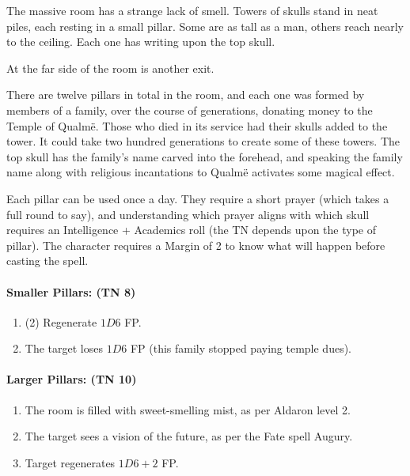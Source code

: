 \begin{multicols}{2}
\begin{boxtext}
	The massive room has a strange lack of smell.  Towers of skulls stand in neat piles, each resting in a small pillar.  Some are as tall as a man, others reach nearly to the ceiling.  Each one has writing upon the top skull.

	At the far side of the room is another exit.

\end{boxtext}

There are twelve pillars in total in the room, and each one was formed by members of a family, over the course of generations, donating money to the Temple of Qualm\"{e}.  Those who died in its service had their skulls added to the tower.  It could take two hundred generations to create some of these towers.  The top skull has the family's name carved into the forehead, and speaking the family name along with religious incantations to Qualm\"{e} activates some magical effect.

Each pillar can be used once a day.  They require a short prayer (which takes a full round to say), and understanding which prayer aligns with which skull requires an Intelligence + Academics roll (the TN depends upon the type of pillar).  The character requires a Margin of 2 to know what will happen before casting the spell.

\paragraph{Smaller Pillars: (TN 8)}

\begin{enumerate}

	\item{(2) Regenerate $1D6$ FP.}
	\item{The target loses $1D6$ FP (this family stopped paying temple dues).}
\end{enumerate}

\paragraph{Larger Pillars: (TN 10)}

\begin{enumerate}

	\item{The room is filled with sweet-smelling mist, as per Aldaron level 2.}
	\item{The target sees a vision of the future, as per the Fate spell Augury.}
	\item{Target regenerates $1D6+2$ FP.}
\end{enumerate}


\end{multicols}
